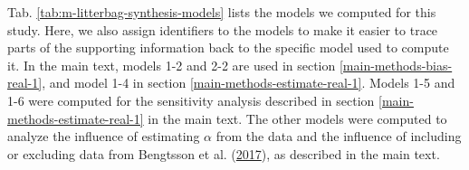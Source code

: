 \documentclass[
  12pt,
]{article}
\begin{document}
Tab. \ref{tab:m-litterbag-synthesis-models} lists the models we computed for this study. Here, we also assign identifiers to the models to make it easier to trace parts of the supporting information back to the specific model used to compute it. In the main text, models 1-2 and 2-2 are used in section \ref{main-methods-bias-real-1}, and model 1-4 in section \ref{main-methods-estimate-real-1}. Models 1-5 and 1-6 were computed for the sensitivity analysis described in section \ref{main-methods-estimate-real-1} in the main text. The other models were computed to analyze the influence of estimating \(\alpha\) from the data and the influence of including or excluding data from Bengtsson et al. (\protect\hyperlink{ref-Bengtsson.2017}{2017}), as described in the main text.
\end{document}
